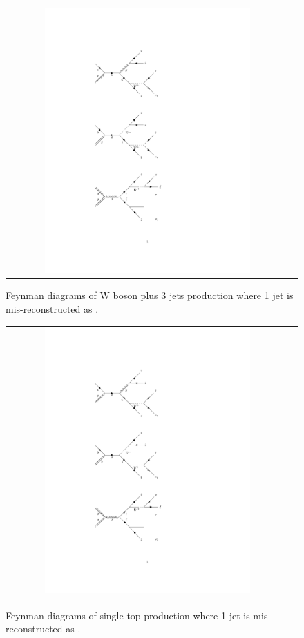 \begin{figure}[tbh!]
	\centering
	\begin{tabular}{cc}
		\includegraphics[width=0.75\textwidth]{diagrams/pics/background_W3jets.pdf}
	\end{tabular}
	\caption{Feynman diagrams of W boson plus 3 jets production where 1 jet is mis-reconstructed as \hadtau. }
	\label{fig:background_W3jets}
\end{figure}

\begin{figure}[tbh!]
	\centering
	\begin{tabular}{cc}
		\includegraphics[width=0.75\textwidth]{diagrams/pics/background_singlet.pdf}
	\end{tabular}
	\caption{Feynman diagrams of single top production where 1 jet is mis-reconstructed as \hadtau. }
	\label{fig:background_singlet}
\end{figure}

